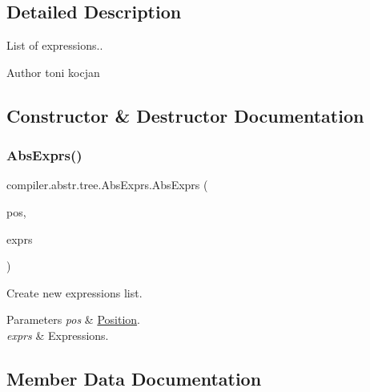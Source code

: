 \subsection{Detailed Description}
List of expressions..

\begin{DoxyAuthor}{Author}
toni kocjan 
\end{DoxyAuthor}


\subsection{Constructor \& Destructor Documentation}
\mbox{\label{classcompiler_1_1abstr_1_1tree_1_1_abs_exprs_a5672add36839981ae6ce3d7709db7518}} 
\subsubsection{\texorpdfstring{Abs\+Exprs()}{AbsExprs()}}
{\footnotesize\ttfamily compiler.\+abstr.\+tree.\+Abs\+Exprs.\+Abs\+Exprs (\begin{DoxyParamCaption}\item[{\hyperlink{classcompiler_1_1_position}{Position}}]{pos,  }\item[{Linked\+List$<$ \hyperlink{classcompiler_1_1abstr_1_1tree_1_1expr_1_1_abs_expr}{Abs\+Expr} $>$}]{exprs }\end{DoxyParamCaption})}

Create new expressions list.


\begin{DoxyParams}{Parameters}
{\em pos} & \hyperlink{classcompiler_1_1_position}{Position}. \\
\hline
{\em exprs} & Expressions. \\
\hline
\end{DoxyParams}


\subsection{Member Data Documentation}
\mbox{\label{classcompiler_1_1abstr_1_1tree_1_1_abs_exprs_a4af862f69f6efc24fc2421ec5470a412}} 

